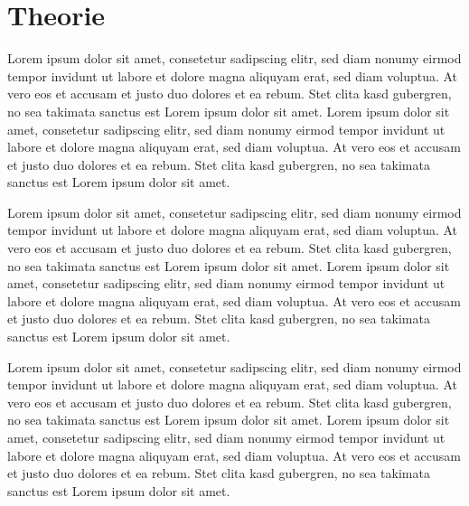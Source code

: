 
\chapter{Theorie}
\label{cha:Theorie}
Lorem ipsum dolor sit amet, consetetur sadipscing elitr, sed diam nonumy eirmod tempor invidunt ut labore et dolore magna aliquyam erat, sed diam voluptua. At vero eos et accusam et justo duo dolores et ea rebum. Stet clita kasd gubergren, no sea takimata sanctus est Lorem ipsum dolor sit amet. Lorem ipsum dolor sit amet, consetetur sadipscing elitr, sed diam nonumy eirmod tempor invidunt ut labore et dolore magna aliquyam erat, sed diam voluptua. At vero eos et accusam et justo duo dolores et ea rebum. Stet clita kasd gubergren, no sea takimata sanctus est Lorem ipsum dolor sit amet.

Lorem ipsum dolor sit amet, consetetur sadipscing elitr, sed diam nonumy eirmod tempor invidunt ut labore et dolore magna aliquyam erat, sed diam voluptua. At vero eos et accusam et justo duo dolores et ea rebum. Stet clita kasd gubergren, no sea takimata sanctus est Lorem ipsum dolor sit amet. Lorem ipsum dolor sit amet, consetetur sadipscing elitr, sed diam nonumy eirmod tempor invidunt ut labore et dolore magna aliquyam erat, sed diam voluptua. At vero eos et accusam et justo duo dolores et ea rebum. Stet clita kasd gubergren, no sea takimata sanctus est Lorem ipsum dolor sit amet.

Lorem ipsum dolor sit amet, consetetur sadipscing elitr, sed diam nonumy eirmod tempor invidunt ut labore et dolore magna aliquyam erat, sed diam voluptua. At vero eos et accusam et justo duo dolores et ea rebum. Stet clita kasd gubergren, no sea takimata sanctus est Lorem ipsum dolor sit amet. Lorem ipsum dolor sit amet, consetetur sadipscing elitr, sed diam nonumy eirmod tempor invidunt ut labore et dolore magna aliquyam erat, sed diam voluptua. At vero eos et accusam et justo duo dolores et ea rebum. Stet clita kasd gubergren, no sea takimata sanctus est Lorem ipsum dolor sit amet.

